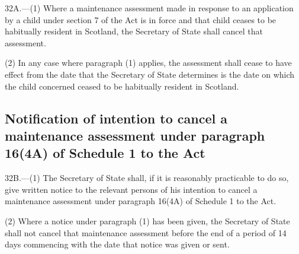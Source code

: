 \documentclass[a4paper,12pt]{article}
\begin{document}
32A.—(1) Where a maintenance assessment made in response to an application by a child under section 7 of the Act is in force and that child ceases to be habitually resident in Scotland, 
the Secretary of State  %
shall cancel that assessment.

(2) In any case where paragraph (1) applies, the assessment shall cease to have effect from the date that 
the Secretary of State  %
determines is the date on which the child concerned ceased to be habitually resident in Scotland.


\subsection[32B. Notification of intention to cancel a maintenance assessment under paragraph 16(4A) of Schedule 1 to the Act]{Notification of intention to cancel a maintenance assessment under paragraph 16(4A) of Schedule 1 to the Act}

32B.—(1) 
The Secretary of State  %
shall, if it is reasonably practicable to do so, give written notice to the relevant persons of his intention to cancel a maintenance assessment under paragraph 16(4A) of Schedule 1 to the Act.

(2) Where a notice under paragraph (1) has been given, 
the Secretary of State  %
shall not cancel that maintenance assessment before the end of a period of 14 days commencing with the date that notice was given or sent.

\end{document}
